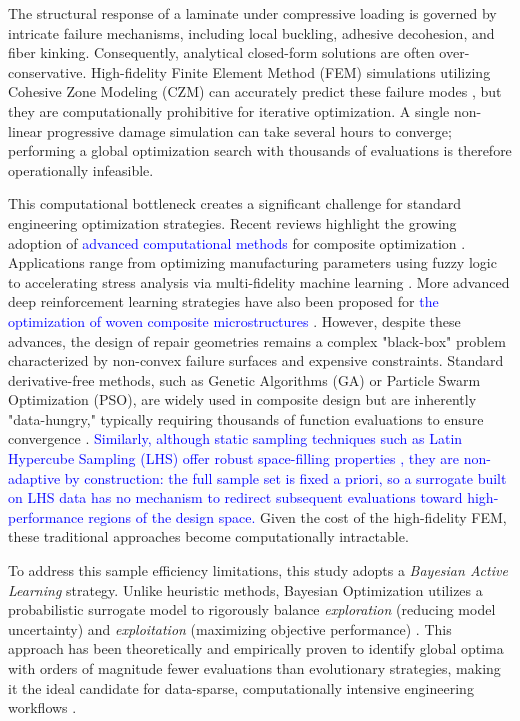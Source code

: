 \documentclass[
  preprint,
  12pt,
  a4paper
]{elsarticle}
\newcommand{\new}[1]{\textcolor{blue}{#1}}
\begin{document}
The structural response of a laminate under compressive loading is governed by intricate failure mechanisms, including local buckling, adhesive decohesion, and fiber kinking. Consequently, analytical closed-form solutions are often over-conservative. High-fidelity Finite Element Method (FEM) simulations utilizing Cohesive Zone Modeling (CZM) can accurately predict these failure modes \cite{turon2007engineering, alfano2001finite}, but they are computationally prohibitive for iterative optimization. A single non-linear progressive damage simulation can take several hours to converge; performing a global optimization search with thousands of evaluations is therefore operationally infeasible.

This computational bottleneck creates a significant challenge for standard engineering optimization strategies. Recent reviews highlight the growing adoption of \new{advanced computational methods} for composite optimization \cite{chen2023intelligent}. Applications range from optimizing manufacturing parameters using fuzzy logic \cite{babu2021artificial} to accelerating stress analysis via multi-fidelity machine learning \cite{azeem2024machine}. More advanced deep reinforcement learning strategies have also been proposed for \new{the optimization of woven composite microstructures} \cite{hsu2025ai}. However, despite these advances, the design of repair geometries remains a complex "black-box" problem characterized by non-convex failure surfaces and expensive constraints. Standard derivative-free methods, such as Genetic Algorithms (GA) or Particle Swarm Optimization (PSO), are widely used in composite design but are inherently "data-hungry," typically requiring thousands of function evaluations to ensure convergence \cite{deb2002fast, queipo2005surrogate}. \new{Similarly, although static sampling techniques such as Latin Hypercube Sampling (LHS) offer robust space-filling properties \cite{mckay1979comparison}, they are non-adaptive by construction: the full sample set is fixed a priori, so a surrogate built on LHS data has no mechanism to redirect subsequent evaluations toward high-performance regions of the design space.} Given the cost of the high-fidelity FEM, these traditional approaches become computationally intractable.

To address this sample efficiency limitations, this study adopts a \textit{Bayesian Active Learning} strategy. Unlike heuristic methods, Bayesian Optimization utilizes a probabilistic surrogate model to rigorously balance \textit{exploration} (reducing model uncertainty) and \textit{exploitation} (maximizing objective performance) \cite{shahriari2015taking}. This approach has been theoretically and empirically proven to identify global optima with orders of magnitude fewer evaluations than evolutionary strategies, making it the ideal candidate for data-sparse, computationally intensive engineering workflows \cite{jones1998efficient, ghosh2023digital}.
\end{document}
